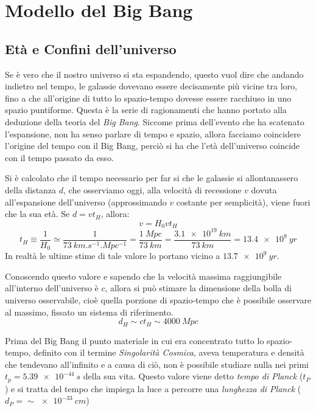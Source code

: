 \section{Modello del Big Bang}\label{sec:big-bang}
\subsection{Età e Confini dell'universo}\label{sec:eta-confini-universo}

Se è vero che il nostro universo si sta espandendo, questo vuol dire che andando indietro nel tempo, le galassie dovevano essere decisamente più vicine tra loro, fino a che all'origine di tutto lo spazio-tempo dovesse essere racchiuso in uno spazio puntiforme. Questa è la serie di ragionamenti che hanno portato alla deduzione della teoria del \textit{Big Bang}. Siccome prima dell'evento che ha scatenato l'espansione, non ha senso parlare di tempo e spazio, allora facciamo coincidere l'origine del tempo con il Big Bang, perciò si ha che l'età dell'universo coincide con il tempo passato da esso.

Si è calcolato che il tempo necessario per far si che le galassie si allontanassero della distanza $d$, che osserviamo oggi, alla velocità di recessione $v$ dovuta all'espansione dell'universo (approssimando $v$ costante per semplicità), viene fuori che la sua età. Se $d = v t_H$, allora:
\[
    v = H_0 v t_H
\]
\begin{equation} \label{eq:eta-universo}
    t_H \equiv \frac{1}{H_0} \simeq \frac{1}{\SI{73}{km.s^{-1}.Mpc^{-1}}} = \frac{\SI{1}{Mpc}}{\SI{73}{km}} = \frac{\SI{3.1e19}{km}}{\SI{73}{km}} = \SI{13.4e9}{yr}
\end{equation}
In realtà le ultime stime di tale valore lo portano vicino a $\SI{13.7e9}{yr}$.

Conoscendo questo valore e sapendo che la velocità massima raggiungibile all'interno dell'universo è $c$, allora si può stimare la dimensione della bolla di universo osservabile, cioè quella porzione di spazio-tempo che è possibile osservare al massimo, fissato un sistema di riferimento.
\[
    d_H \sim c t_H \sim \SI{4000}{Mpc}
\]

Prima del Big Bang il punto materiale in cui era concentrato tutto lo spazio-tempo, definito con il termine \textit{Singolarità Cosmica}, aveva temperatura e densità che tendevano all'infinito e a causa di ciò, non è possibile studiare nulla nei primi $t_p = \SI{5.39e-44}{s}$ della sua vita. Questo valore viene detto \textit{tempo di Planck} ($t_P$) e si tratta del tempo che impiega la luce a percorre una \textit{lunghezza di Planck} ($d_P = \sim \SI{e-33}{cm}$)

